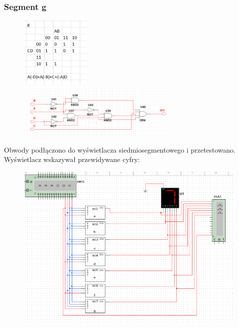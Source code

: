 \documentclass[12pt,a4paper]{article}
\begin{document}
\subsubsection{Segment g}
\begin{figure}[H]
\centering
\includegraphics[width=0.3\textwidth]{7seg/seg6}
\includegraphics[width=0.7\textwidth]{7seg/seg6circ}
\end{figure}

\newpage
Obwody podłączono do wyświetlacza siedmiosegmentowego i przetestowano. Wyświetlacz wskazywał przewidywane cyfry:

\begin{figure}[H]
\centering
\includegraphics[width=\textwidth]{7seg/7segall}
\end{figure}
\end{document}
